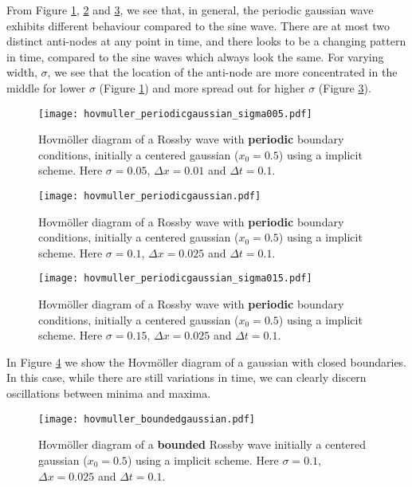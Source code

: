 From Figure \ref{fig:hovmollerGaussianPeriodic005}, \ref{fig:hovmollerGaussianPeriodic} and \ref{fig:hovmollerGaussianPeriodic015}, we see that, in general, the periodic gaussian wave exhibits different behaviour compared to the sine wave. There are at most two distinct anti-nodes at any point in time, and there looks to be a changing pattern in time, compared to the sine waves which always look the same. For varying width, $\sigma$, we see that the location of the anti-node are more concentrated in the middle for lower $\sigma$ (Figure \ref{fig:hovmollerGaussianPeriodic005}) and more spread out for higher $\sigma$ (Figure \ref{fig:hovmollerGaussianPeriodic015}).
\begin{figure}[htbp]
	\centering
	\texttt{[image: hovmuller\_periodicgaussian\_sigma005.pdf]}
	\caption{Hovmöller diagram of a Rossby wave with \textbf{periodic} boundary conditions, initially a centered gaussian ($x_0=0.5$) using a implicit scheme. Here $\sigma = 0.05$, $\Delta x = 0.01$ and $\Delta t = 0.1$.}
	\label{fig:hovmollerGaussianPeriodic005}
\end{figure}

\begin{figure}[htbp]
	\centering
	\texttt{[image: hovmuller\_periodicgaussian.pdf]}
	\caption{Hovmöller diagram of a Rossby wave with \textbf{periodic} boundary conditions, initially a centered gaussian ($x_0=0.5$) using a implicit scheme. Here $\sigma = 0.1$, $\Delta x = 0.025$ and $\Delta t = 0.1$.}
	\label{fig:hovmollerGaussianPeriodic}
\end{figure}

\begin{figure}[htbp]
	\centering
	\texttt{[image: hovmuller\_periodicgaussian\_sigma015.pdf]}
	\caption{Hovmöller diagram of a Rossby wave with \textbf{periodic} boundary conditions, initially a centered gaussian ($x_0=0.5$) using a implicit scheme. Here $\sigma = 0.15$, $\Delta x = 0.025$ and $\Delta t = 0.1$.}
	\label{fig:hovmollerGaussianPeriodic015}
\end{figure}

In Figure \ref{fig:hovmollerGaussianBounded} we show the Hovmöller diagram of a gaussian with closed boundaries. In this case, while there are still variations in time, we can clearly discern oscillations between minima and maxima.
\begin{figure}[htbp]
	\centering
	\texttt{[image: hovmuller\_boundedgaussian.pdf]}
	\caption{Hovmöller diagram of a \textbf{bounded} Rossby wave initially a centered gaussian ($x_0=0.5$) using a implicit scheme. Here $\sigma = 0.1$, $\Delta x = 0.025$ and $\Delta t = 0.1$.}
	\label{fig:hovmollerGaussianBounded}
\end{figure}

